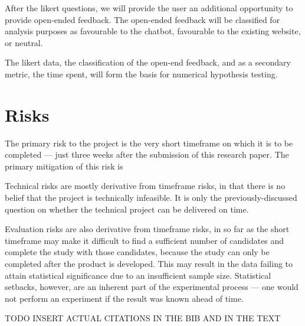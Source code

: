 \documentclass[conference]{IEEEtran}
\begin{document}
After the likert questions, we will provide the user an additional opportunity
to provide open-ended feedback. The open-ended feedback will be classified for
analysis purposes as favourable to the chatbot, favourable to the existing
website, or neutral.

The likert data, the classification of the open-end feedback, and as a
secondary metric, the time spent, will form the basis for numerical hypothesis
testing.

\section{Risks}

The primary risk to the project is the very short timeframe on which it is to be completed --- just three weeks after the submission of this research paper. The primary mitigation of this risk is 

Technical risks are mostly derivative from timeframe risks, in that there is no
belief that the project is technically infeasible. It is only the
previously-discussed question on whether the technical project can be delivered
on time.

Evaluation risks are also derivative from timeframe risks, in so far as the short
timeframe may make it difficult to find a sufficient number of candidates and
complete the study with those candidates, because the study can only be completed
after the product is developed. This may result in the data failing to attain
statistical significance due to an insufficient sample size. Statistical setbacks,
however, are an inherent part of the experimental process --- one would not
perform an experiment if the result was known ahead of time.

TODO INSERT ACTUAL CITATIONS IN THE BIB AND IN THE TEXT
\end{document}
